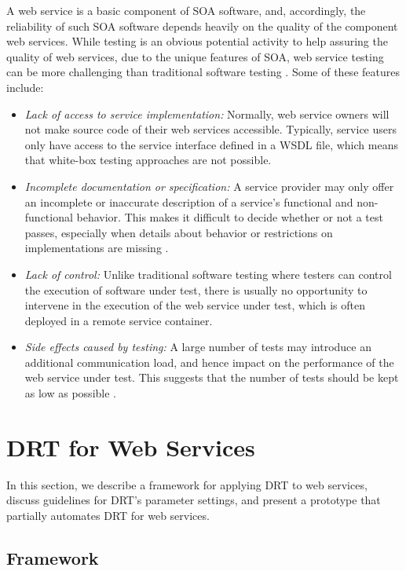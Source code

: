 \documentclass[10pt,journal,compsoc]{IEEEtran}
\begin{document}
A web service is a basic component of SOA software, and, accordingly, the reliability of such SOA software depends heavily on the quality of the component web services.
While testing is an obvious potential activity to help assuring the quality of web services, due to the unique features of SOA, web service testing can be more challenging than traditional software testing \cite{canfora}.
Some of these features include:
\begin{itemize}
  \item
  \emph{Lack of access to service implementation:}
  Normally, web service owners will not make source code of their web services accessible.
  Typically, service users only have access to the service interface defined in a WSDL file, which means that white-box testing approaches are not possible.
  \item
  \emph{Incomplete documentation or specification:}
  A service provider may only offer an incomplete or inaccurate description of a service's functional and non-functional behavior.
  This makes it difficult to decide whether or not a test passes, especially when details about behavior or restrictions on implementations are missing \cite{sun2018constraint}.
  \item
  \emph{Lack of control:}
  Unlike traditional software testing where testers can control the execution of software under test, there is usually no opportunity to intervene in the execution of the web service under test, which is often deployed in a remote service container.

  \item
  \emph{Side effects caused by testing:}
  A large number of tests may introduce an additional communication load, and hence impact on the performance of the web service under test.
  This suggests that the number of tests should be kept as low as possible \cite{sunreview}.
\end{itemize}

\section{DRT for Web Services}
\label{sec:DRTforwebserivce}

In this section, we describe a framework for applying DRT to web services, discuss guidelines for DRT's parameter settings, and present a prototype that partially automates  DRT for web services.

\subsection{Framework}
\label{sec:framework}
\end{document}
